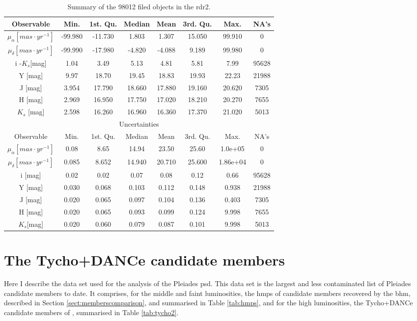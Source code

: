 \begin{table}[ht!]
\caption{Summary of the 98012 filed objects in the \gls{rdr2}.}
\begin{center}
\begin{tabular}{|c|c|c|c|c|c|c|c|}
\hline
Observable & Min. & 1st. Qu. & Median & Mean & 3rd. Qu. & Max. & NA's \\
\hline
\hline
$\mu_{\alpha} [mas\cdot yr^{-1}]$&-99.980& -11.730  & 1.803 &  1.307 & 15.050 & 99.910&0\\
$\mu_{\delta} [mas\cdot yr^{-1}]$&-99.990& -17.980  &-4.820  &-4.088   &9.189  &99.980&0\\
i -$K_s$[mag] &   1.04 &   3.49  &  5.13    &   4.81  &  5.81  &  7.99 &  95628 \\
Y [mag]          & 9.97  & 18.70      &  19.45 &  18.83 &  19.93 &  22.23  & 21988 \\
J [mag]          & 3.954 & 17.790 & 18.660 & 17.880 & 19.160 & 20.620 &   7305\\
H [mag]         & 2.969 & 16.950 & 17.750 & 17.020 & 18.210 & 20.270  &  7655\\
$K_s$ [mag] & 2.598 & 16.260 & 16.960  &16.360  &17.370 & 21.020 &   5013\\
\hline
\multicolumn{8}{c}{Uncertainties}\\
\hline
Observable & Min. & 1st. Qu. & Median &Mean& 3rd. Qu. & Max. & NA's \\
\hline
\hline
$\mu_{\alpha} [mas\cdot yr^{-1}]$&0.08  &    8.65   &  14.94   &  23.50   &  25.60 &1.0e+05&0\\ 
$\mu_{\delta} [mas\cdot yr^{-1}]$&0.085  &   8.652  &  14.940  &  20.710  &  25.600 &1.86e+04 & 0\\ 
i [mag] & 0.02        &  0.02    &    0.07 &   0.08 &  0.12   & 0.66    &    95628 \\
Y [mag] & 0.030     &   0.068&   0.103&  0.112 &   0.148&0.938  &   21988\\
J [mag] & 0.020      &  0.065  & 0.097  & 0.104 & 0.136  &0.403   & 7305\\
H [mag] & 0.020     &  0.065  & 0.093  &0.099  & 0.124  &9.998   & 7655\\
$K_s$[mag]&0.020 &  0.060 &  0.079 & 0.087  & 0.101 & 9.998  & 5013\\
\hline
\end{tabular}
\end{center}
\label{tab:rddr2_field}
\end{table}%

\section{The Tycho+DANCe candidate members}
\label{sect:Tycho+DANCe}
Here I describe the data set used for the analysis of the Pleiades \gls{psd}. This data set is the largest and less contaminated list of Pleiades candidate members to date. It comprises, for the middle and faint luminosities, the \gls{hmps} of candidate members recovered by the \gls{bhm}, described in Section \ref{sect:memberscomparison}, and summarised in Table \ref{tab:hmps}, and for the high luminosities, the Tycho+DANCe candidate members of \cite{Bouy2015}, summarised in Table \ref{tab:tycho2}.

